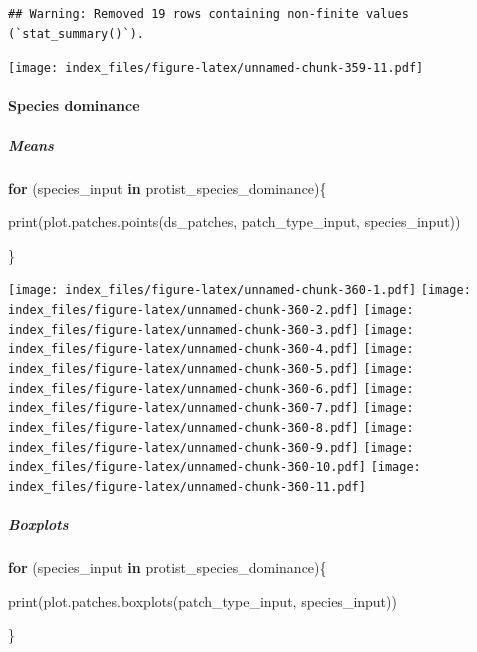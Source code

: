 \documentclass[
]{article}
\newenvironment{Shaded}{\begin{snugshade}}{\end{snugshade}}
\newcommand{\ControlFlowTok}[1]{\textcolor[rgb]{0.13,0.29,0.53}{\textbf{#1}}}
\newcommand{\FunctionTok}[1]{\textcolor[rgb]{0.00,0.00,0.00}{#1}}
\newcommand{\NormalTok}[1]{#1}
\begin{document}
\begin{verbatim}
## Warning: Removed 19 rows containing non-finite values (`stat_summary()`).
\end{verbatim}

\texttt{[image: index\_files/figure-latex/unnamed-chunk-359-11.pdf]}

\hypertarget{species-dominance-2}{%
\paragraph{Species dominance}\label{species-dominance-2}}

\hypertarget{means-32}{%
\subparagraph{Means}\label{means-32}}

\begin{Shaded}
\begin{Highlighting}[]
\ControlFlowTok{for}\NormalTok{ (species\_input }\ControlFlowTok{in}\NormalTok{ protist\_species\_dominance)\{}
  
  \FunctionTok{print}\NormalTok{(}\FunctionTok{plot.patches.points}\NormalTok{(ds\_patches, patch\_type\_input,}
\NormalTok{                            species\_input))}
  
\NormalTok{\}}
\end{Highlighting}
\end{Shaded}

\texttt{[image: index\_files/figure-latex/unnamed-chunk-360-1.pdf]}
\texttt{[image: index\_files/figure-latex/unnamed-chunk-360-2.pdf]}
\texttt{[image: index\_files/figure-latex/unnamed-chunk-360-3.pdf]}
\texttt{[image: index\_files/figure-latex/unnamed-chunk-360-4.pdf]}
\texttt{[image: index\_files/figure-latex/unnamed-chunk-360-5.pdf]}
\texttt{[image: index\_files/figure-latex/unnamed-chunk-360-6.pdf]}
\texttt{[image: index\_files/figure-latex/unnamed-chunk-360-7.pdf]}
\texttt{[image: index\_files/figure-latex/unnamed-chunk-360-8.pdf]}
\texttt{[image: index\_files/figure-latex/unnamed-chunk-360-9.pdf]}
\texttt{[image: index\_files/figure-latex/unnamed-chunk-360-10.pdf]}
\texttt{[image: index\_files/figure-latex/unnamed-chunk-360-11.pdf]}

\hypertarget{boxplots-30}{%
\subparagraph{Boxplots}\label{boxplots-30}}

\begin{Shaded}
\begin{Highlighting}[]
\ControlFlowTok{for}\NormalTok{ (species\_input }\ControlFlowTok{in}\NormalTok{ protist\_species\_dominance)\{}
  
  \FunctionTok{print}\NormalTok{(}\FunctionTok{plot.patches.boxplots}\NormalTok{(patch\_type\_input,}
\NormalTok{                            species\_input))}
  
\NormalTok{\}}
\end{Highlighting}
\end{Shaded}
\end{document}
